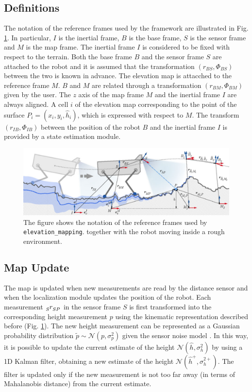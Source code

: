 \subsection{Definitions}
The notation of the reference frames used by the framework are illustrated in 
Fig. \ref{fig:elevationmapping-coords-illustration}. In particular, $I$ is the 
inertial frame, $B$ is the base frame, $S$ is the sensor frame and $M$ is the 
map frame. The inertial frame $I$ is considered to be fixed with respect to the 
terrain. Both the base frame $B$ and the sensor frame $S$ are attached to the 
robot and it is assumed that the transformation $(r_{BS}, \Phi_{BS})$ between 
the two is known in advance. The elevation map is attacched to  
the reference frame $M$. $B$ and $M$ are related through a transformation 
$(r_{BM}, \Phi_{BM})$ given by the user. The $z$ axis of the map frame $M$ and 
the inertial frame $I$ are always aligned. A cell $i$ of the elevation map 
corresponding to the point of the surface $P_i = (x_i, y_i, \hat{h}_i)$,
which is expressed 
with respect to $M$. The transform $(r_{IB}, \Phi_{IB})$ between the position
of the robot $B$ and the 
inertial frame $I$ is provided by a state estimation module.
\begin{figure}
  \centering
  \includegraphics[width=\textwidth]
      {figures/elevationmapping-coords-illustration.png}
  \caption{The figure shows the notation of the reference frames used by 
      \texttt{elevation\_mapping}.
      \cite{Fankhauser2018ProbabilisticTerrainMapping} together with the 
      robot moving inside a rough environment.}
  \label{fig:elevationmapping-coords-illustration}
\end{figure}

\subsection{Map Update}
The map is updated when new measurements are read by the distance sensor and 
when the localization module updates the position of the robot. Each 
measurement $\tensor[_S]{r}{_{SP}}$ in the sensor frame $S$ is first transformed 
into the corresponding height measurement $p$ using the kinematic 
representation described before (Fig.
\ref{fig:elevationmapping-coords-illustration}).
The new height measurement can be represented as a Gaussian probability
distribution $\tilde{p} \sim \mathcal{N}(p, \sigma_p^2)$ given the sensor noise 
model \cite{Fankhauser2015Kinectv2}. In this way, it is possible to update 
the current estimate of the height $\mathcal{N}(\hat{h}, \sigma_h^2)$ by using 
a 1D Kalman filter, obtaining a new estimate of the height
$\mathcal{N}(\hat{h}^{+}, \sigma_h^{2+})$. The filter is updated only if the 
new measurement is not too far away (in terms of Mahalanobis distance)
from the current estimate.

